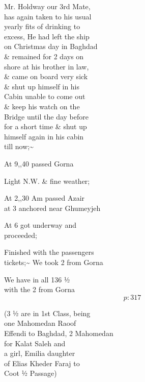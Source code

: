\documentclass{report}
\begin{document}
	\par{
 	Mr. Holdway our 3rd Mate,\ \\has again taken to his usual\ \\yearly fits of drinking to\ \\excess, He had left the ship\ \\on Christmas day in Baghdad\ \\\& remained for 2 days on\ \\shore at his brother in law,\ \\\& came on board very sick\ \\\& shut up himself in his\ \\Cabin unable to come out\ \\\& keep his watch on the\ \\Bridge until the day before\ \\for a short time \& shut up\ \\himself again in his cabin\ \\till now;\~{}\ \\
	}

	\par{
 	At 9,,40 passed Gorna\ \\
	}

	\par{
 	Light N.W. \& fine weather;\ \\
	}

	\par{
 	At 2,,30 Am passed Azair\ \\at 3 anchored near Ghumeyjeh\ \\
	}

	\par{
 	At 6 got underway and\ \\proceeded;\ \\
	}

	\par{
 	Finished with the passengers\ \\tickets;\~{} We took 2 from Gorna\ \\
	}

	\par{
 	We have in all 136 ½\ \\with the 2 from Gorna\ \\
  \[p: 317 \]

	}



	\par{
 	(3 ½ are in 1st Class, being\ \\one Mahomedan Raoof\ \\Effendi to Baghdad, 2 Mahomedan\ \\for Kalat Saleh and\ \\a girl, Emilia daughter\ \\of Elias Kheder Faraj to\ \\Coot ½ Passage)\ \\
	}
\end{document}
